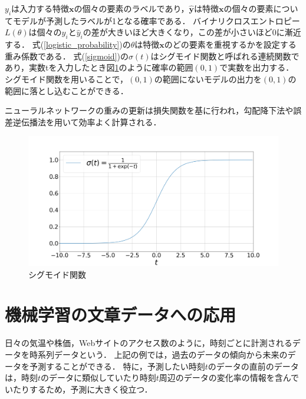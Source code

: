 \documentclass[12pt,a4j,dvipdfmx]{jreport}
\begin{document}
$y_{i}$は入力する特徴$\bm{x}$の個々の要素のラベルであり，$\hat{\bm{y}}$は特徴$\bm{x}$の個々の要素についてモデルが予測したラベルが1となる確率である．
バイナリクロスエントロピー$L(\theta)$は個々の$y_{i}$と$\hat{y}_{i}$の差が大きいほど大きくなり，この差が小さいほど0に漸近する．
式(\ref{logistic_probability})の$\theta$は特徴$\bm{x}$のどの要素を重視するかを設定する重み係数である．
式(\ref{sigmoid})の$\sigma(t)$はシグモイド関数と呼ばれる連続関数であり，実数tを入力したとき図\ref{fig_sigmoid}のように確率の範囲$(0, 1)$で実数を出力する．シグモイド関数を用いることで，$(0, 1)$の範囲にないモデルの出力を$(0, 1)$の範囲に落とし込むことができる．

ニューラルネットワークの重みの更新は損失関数を基に行われ，勾配降下法や誤差逆伝播法を用いて効率よく計算される．

\begin{figure}[H]
  \centering
  \includegraphics[keepaspectratio, width=120mm]{img/sigmoid.png}
  \caption{シグモイド関数}
  \label{fig_sigmoid}
\end{figure}





\section{機械学習の文章データへの応用}
\label{apply_for_time_series_data}
日々の気温や株価，Webサイトのアクセス数のように，時刻ごとに計測されるデータを時系列データという\cite{aurellen20}．
上記の例では，過去のデータの傾向から未来のデータを予測することができる．
特に，予測したい時刻$t$のデータの直前のデータは，時刻$t$のデータに類似していたり時刻$t$周辺のデータの変化率の情報を含んでいたりするため，予測に大きく役立つ．
\end{document}
